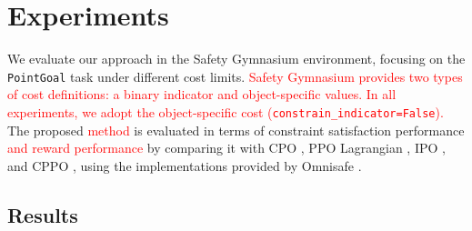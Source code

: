 \section{Experiments}

We evaluate our approach in the Safety Gymnasium \cite{ji2023safety} environment, focusing on the \texttt{PointGoal} task under different cost limits.
\textcolor{red}{Safety Gymnasium provides two types of cost definitions: a binary indicator and object-specific values.}
\textcolor{red}{In all experiments, we adopt the object-specific cost (\texttt{constrain\_indicator=False}).}
The proposed \textcolor{red}{method} is evaluated in terms of constraint satisfaction performance \textcolor{red}{and reward performance} by comparing it with CPO \cite{achiam2017constrained}, PPO Lagrangian \cite{ray2019benchmarking}, IPO \cite{liu2020ipo}, and CPPO \cite{stooke2020responsive}, using the implementations provided by Omnisafe \cite{ji2024omnisafe}.

\subsection{Results}

